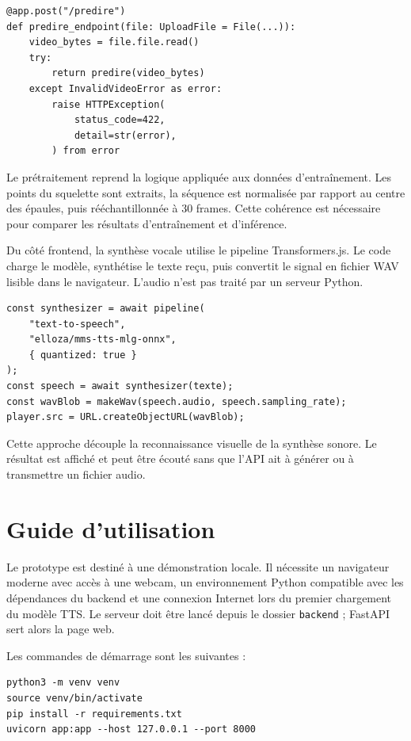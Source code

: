 \begin{verbatim}
@app.post("/predire")
def predire_endpoint(file: UploadFile = File(...)):
    video_bytes = file.file.read()
    try:
        return predire(video_bytes)
    except InvalidVideoError as error:
        raise HTTPException(
            status_code=422,
            detail=str(error),
        ) from error
\end{verbatim}

Le prétraitement reprend la logique appliquée aux données d'entraînement. Les points du squelette sont extraits, la séquence est normalisée par rapport au centre des épaules, puis rééchantillonnée à 30 frames. Cette cohérence est nécessaire pour comparer les résultats d'entraînement et d'inférence.

Du côté frontend, la synthèse vocale utilise le pipeline Transformers.js. Le code charge le modèle, synthétise le texte reçu, puis convertit le signal en fichier WAV lisible dans le navigateur. L'audio n'est pas traité par un serveur Python.

\begin{verbatim}
const synthesizer = await pipeline(
    "text-to-speech",
    "elloza/mms-tts-mlg-onnx",
    { quantized: true }
);
const speech = await synthesizer(texte);
const wavBlob = makeWav(speech.audio, speech.sampling_rate);
player.src = URL.createObjectURL(wavBlob);
\end{verbatim}

Cette approche découple la reconnaissance visuelle de la synthèse sonore. Le résultat est affiché et peut être écouté sans que l'API ait à générer ou à transmettre un fichier audio.

\section{Guide d'utilisation}

Le prototype est destiné à une démonstration locale. Il nécessite un navigateur moderne avec accès à une webcam, un environnement Python compatible avec les dépendances du backend et une connexion Internet lors du premier chargement du modèle TTS. Le serveur doit être lancé depuis le dossier \texttt{backend} ; FastAPI sert alors la page web.

Les commandes de démarrage sont les suivantes :

\begin{verbatim}
python3 -m venv venv
source venv/bin/activate
pip install -r requirements.txt
uvicorn app:app --host 127.0.0.1 --port 8000
\end{verbatim}


